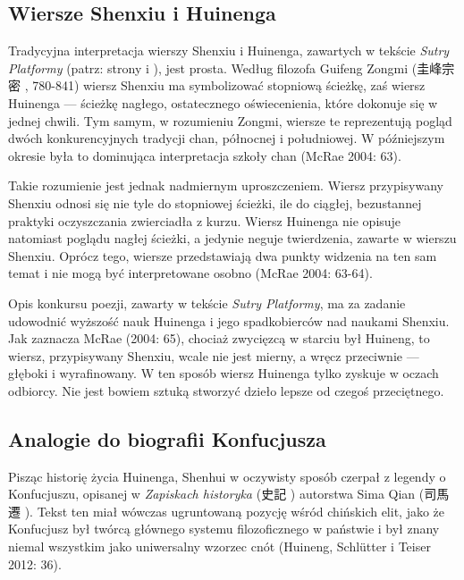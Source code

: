 \subsection{Wiersze Shenxiu i Huinenga}
Tradycyjna interpretacja wierszy Shenxiu i Huinenga, zawartych w tekście \textit{Sutry Platformy} (patrz: strony \pageref{ShenxiuVerse} i \pageref{HuinengVerse}), jest prosta.
Według filozofa Guifeng Zongmi (圭峰宗密 , 780-841) wiersz Shenxiu ma symbolizować stopniową ścieżkę, zaś wiersz Huinenga --- ścieżkę nagłego, ostatecznego oświecenienia, które dokonuje się w jednej chwili.
Tym samym, w rozumieniu Zongmi, wiersze te reprezentują pogląd dwóch konkurencyjnych tradycji chan, północnej i południowej.
W późniejszym okresie była to dominująca interpretacja szkoły chan
(McRae 2004: 63).

Takie rozumienie jest jednak nadmiernym uproszczeniem. Wiersz przypisywany Shenxiu odnosi się nie tyle do stopniowej ścieżki, ile do ciągłej, bezustannej praktyki oczyszczania zwierciadła z kurzu.
Wiersz Huinenga nie opisuje natomiast poglądu nagłej ścieżki, a jedynie neguje twierdzenia, zawarte w wierszu Shenxiu.
Oprócz tego, wiersze przedstawiają dwa punkty widzenia na ten sam temat i nie mogą być interpretowane osobno
(McRae 2004: 63-64).

Opis konkursu poezji, zawarty w tekście \textit{Sutry Platformy}, ma za zadanie udowodnić wyższość nauk Huinenga i jego spadkobierców nad naukami Shenxiu.
Jak zaznacza McRae (2004: 65), chociaż zwycięzcą w starciu był Huineng, to wiersz, przypisywany Shenxiu, wcale nie jest mierny, a wręcz przeciwnie --- głęboki i wyrafinowany.
W ten sposób wiersz Huinenga tylko zyskuje w oczach odbiorcy. Nie jest bowiem sztuką stworzyć dzieło lepsze od czegoś przeciętnego.

\subsection{Analogie do biografii Konfucjusza}
Pisząc historię życia Huinenga, Shenhui w oczywisty sposób czerpał z legendy o Konfucjuszu, opisanej w \textit{Zapiskach historyka} (史記 ) autorstwa Sima Qian (司馬遷 ).
Tekst ten miał wówczas ugruntowaną pozycję wśród chińskich elit, jako że Konfucjusz był twórcą głównego systemu filozoficznego w państwie i był znany niemal wszystkim jako uniwersalny wzorzec cnót
(Huineng, Schlütter i Teiser 2012: 36).


